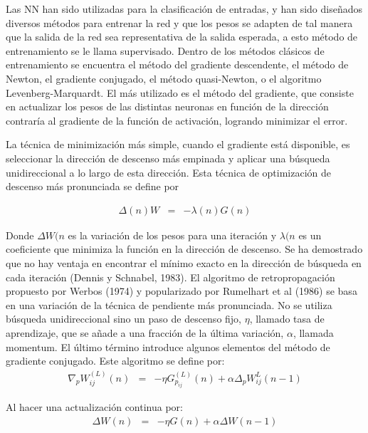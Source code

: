 Las NN han sido utilizadas para la clasificación de entradas, y han sido diseñados diversos métodos para entrenar la red y que los pesos se adapten de tal manera que la salida de la red sea representativa de la salida esperada, a esto método de entrenamiento se le llama supervisado. Dentro de los métodos clásicos de entrenamiento se encuentra el método del gradiente descendente, el método de Newton, el gradiente conjugado, el método quasi-Newton, o el algoritmo Levenberg-Marquardt. El más utilizado es el método del gradiente, que consiste en actualizar los pesos de las distintas neuronas en función de la dirección contraría al gradiente de la función de activación, logrando minimizar el error.

La técnica de minimización más simple, cuando el gradiente está disponible, es seleccionar la dirección de descenso más empinada y aplicar una búsqueda unidireccional a lo largo de esta dirección. Esta técnica de optimización de descenso más pronunciada se define por

\begin{eqnarray}
	\Delta(n) W &=& -\lambda(n)G(n)
\end{eqnarray}

Donde $\Delta W(n$ es la variación de los pesos para una iteración y $\lambda(n$ es un coeficiente que minimiza la función en la dirección de descenso. Se ha demostrado que no hay ventaja en encontrar el mínimo exacto en la dirección de búsqueda en cada iteración (Dennis y Schnabel, 1983). El algoritmo de retropropagación propuesto por Werbos (1974) y popularizado por Rumelhart et al (1986) se basa en una variación de la técnica de pendiente más pronunciada. No se utiliza búsqueda unidireccional sino un paso de descenso fijo, $\eta$, llamado tasa de aprendizaje, que se añade a una fracción de la última variación, $\alpha$, llamada momentum. El último término introduce algunos elementos del método de gradiente conjugado. Este algoritmo se define por:
\begin{eqnarray}
	\nabla_{p}W_{ij}^{(L)}(n) &=& -\eta G_{p_{ij}}^{(L)}(n) + \alpha\Delta_{p}W_{ij}^{L}(n - 1)
\end{eqnarray}

Al hacer una actualización continua por:
\begin{eqnarray}
	\Delta W(n) &=& -\eta G(n) + \alpha\Delta W(n - 1)
\end{eqnarray}

